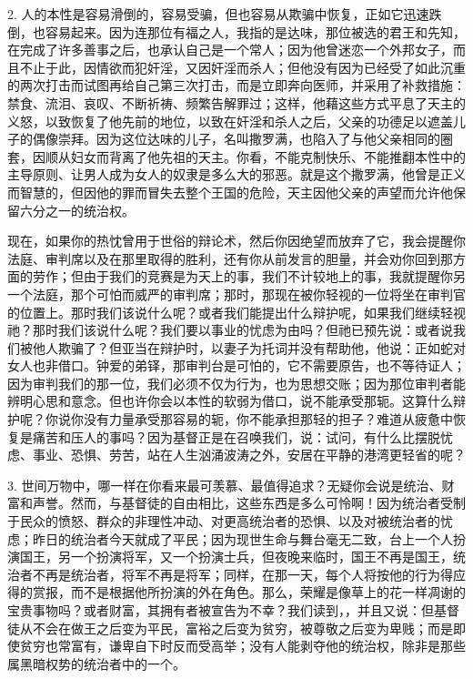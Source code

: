2. 人的本性是容易滑倒的，容易受骗，但也容易从欺骗中恢复，正如它迅速跌倒，也容易起来。因为连那位有福之人，我指的是达味，那位被选的君王和先知，在完成了许多善事之后，也承认自己是一个常人；因为他曾迷恋一个外邦女子，而且不止于此，因情欲而犯奸淫，又因奸淫而杀人；但他没有因为已经受了如此沉重的两次打击而试图再给自己第三次打击，而是立即奔向医师，并采用了补救措施：禁食、流泪、哀叹、不断祈祷、频繁告解罪过；这样，他藉这些方式平息了天主的义怒，以致恢复了他先前的地位，以致在奸淫和杀人之后，父亲的功德足以遮盖儿子的偶像崇拜。因为这位达味的儿子，名叫撒罗满，也陷入了与他父亲相同的圈套，因顺从妇女而背离了他先祖的天主。你看，不能克制快乐、不能推翻本性中的主导原则、让男人成为女人的奴隶是多么大的邪恶。就是这个撒罗满，他曾是正义而智慧的，但因他的罪而冒失去整个王国的危险，天主因他父亲的声望而允许他保留六分之一的统治权。\par

现在，如果你的热忱曾用于世俗的辩论术，然后你因绝望而放弃了它，我会提醒你法庭、审判席以及在那里取得的胜利，还有你从前发言的胆量，并会劝你回到那方面的劳作；但由于我们的竞赛是为天上的事，我们不计较地上的事，我就提醒你另一个法庭，那个可怕而威严的审判席；那时，那现在被你轻视的一位将坐在审判官的位置上。那时我们该说什么呢？或者我们能提出什么辩护呢，如果我们继续轻视祂？那时我们该说什么呢？我们要以事业的忧虑为由吗？但祂已预先说：或者说我们被他人欺骗了？但亚当在辩护时，以妻子为托词并没有帮助他，他说：正如蛇对女人也非借口。钟爱的弟铎，那审判台是可怕的，它不需要原告，也不等待证人；因为审判我们的那一位，我们必须不仅为行为，也为思想交账；因为那位审判者能辨明心思和意念。但也许你会以本性的软弱为借口，说不能承受那轭。这算什么辩护呢？你说你没有力量承受那容易的轭，你不能承担那轻的担子？难道从疲惫中恢复是痛苦和压人的事吗？因为基督正是在召唤我们，说：试问，有什么比摆脱忧虑、事业、恐惧、劳苦，站在人生汹涌波涛之外，安居在平静的港湾更轻省的呢？\par

3. 世间万物中，哪一样在你看来最可羡慕、最值得追求？无疑你会说是统治、财富和声誉。然而，与基督徒的自由相比，这些东西是多么可怜啊！因为统治者受制于民众的愤怒、群众的非理性冲动、对更高统治者的恐惧、以及对被统治者的忧虑；昨日的统治者今天就成了平民；因为现世生命与舞台毫无二致，台上一个人扮演国王，另一个扮演将军，又一个扮演士兵，但夜晚来临时，国王不再是国王，统治者不再是统治者，将军不再是将军；同样，在那一天，每个人将按他的行为得应得的赏报，而不是根据他所扮演的外在角色。那么，荣耀是像草上的花一样凋谢的宝贵事物吗？或者财富，其拥有者被宣告为不幸？我们读到，，并且又说：但基督徒从不会在做王之后变为平民，富裕之后变为贫穷，被尊敬之后变为卑贱；而是即使贫穷也常富有，谦卑自下时反而受高举；没有人能剥夺他的统治权，除非是那些属黑暗权势的统治者中的一个。\par

